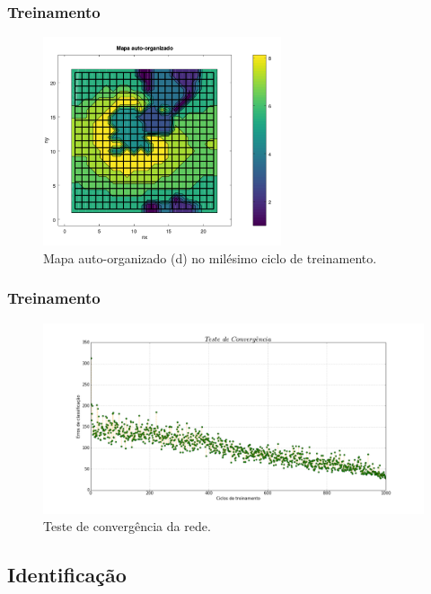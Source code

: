 \documentclass[aspectratio=10]{beamer} %
\begin{document}
\begin{frame}
\frametitle{Treinamento}
\begin{figure}
\centering
\includegraphics[width=7.0cm]{Imagens/SOM1000_2d.pdf}
\caption{Mapa auto-organizado (d) no milésimo ciclo de treinamento.}
\label{SOMd}
\end{figure}
\end{frame}

\begin{frame}
\frametitle{Treinamento}
\begin{figure}[H]
\centering
\includegraphics[scale=0.23]{Imagens/conv070917.png}
\caption{Teste de convergência da rede.}
\label{convergencia}
\end{figure} 
\end{frame}

\subsection{Identificação}
\end{document}

